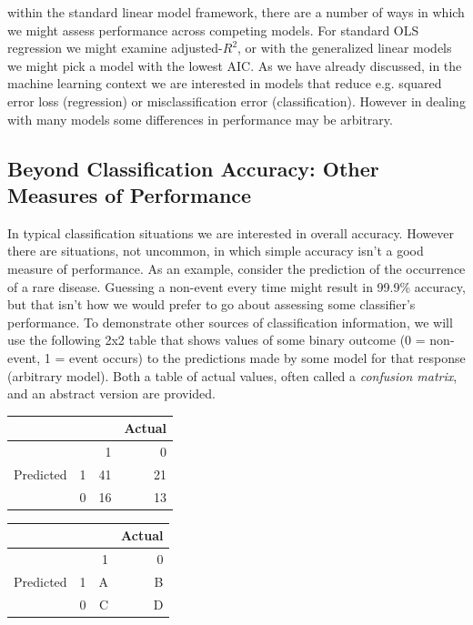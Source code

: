 \documentclass[english,nohyper,titlepage]{tufte-handout}
\begin{document}
 within the standard linear model framework, there are a number of ways in which we might assess performance across competing models.  For standard OLS regression we might examine adjusted-$R^2$, or with the generalized linear models we might pick a model with the lowest AIC.  As we have already discussed, in the machine learning context we are interested in models that reduce e.g. squared error loss (regression) or misclassification error (classification).  However in dealing with many models some differences in performance may be arbitrary.

\subsection{Beyond Classification Accuracy: Other Measures of Performance}
In typical classification situations we are interested in overall accuracy.  However there are situations, not uncommon, in which simple accuracy isn't a good measure of performance.  As an example, consider the prediction of the occurrence of a rare disease. Guessing a non-event every time might result in 99.9\% accuracy, but that isn't how we would prefer to go about assessing some classifier's performance.
To demonstrate other sources of classification information, we will use the following 2x2 table that shows values of some binary outcome (0 = non-event, 1 = event occurs) to the predictions made by some model for that response (arbitrary model).  Both a table of actual values, often called a \emph{confusion matrix}, and an abstract version are provided.


\begin{table}[ht]
\begin{minipage}[b]{0.45\linewidth}
    \begin{tabular}{llrr}
     & & & Actual \\
     \hline
     & & 1 & 0\\ 
     \hline
     Predicted & 1 &  41 &  21 \\ 
     & 0 &  16 &  13\\ 
     \hline
    \end{tabular}
\end{minipage}
\hspace{0.5cm}
\begin{minipage}[b]{0.45\linewidth}
    \begin{tabular}{lrrr}
     & & & Actual \\
     \hline
     & & 1 & 0\\ 
     \hline
     Predicted & 1 &  A &  B \\ 
     & 0 &  C &  D\\ 
     \hline
    \end{tabular}
\end{minipage}
\end{table}
\end{document}
